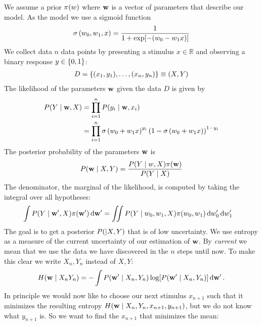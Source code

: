 
We assume a prior ${\pi(w)}$ where ${\bf w}$ is a vector of parameters that describe our model.
As the model we use a sigmoid function
\begin{align}
	{\sigma \left(w_0, w_1, x\right)} = \frac{1}{1 + \exp[-(w_0 - w_1 x)]}
\end{align}
We collect data $n$ data points by presenting a stimulus $x \in \mathbb{R}$ and observing a binary response $y \in \left\{ 0, 1 \right\}$:
\begin{align}
	 D = \left\{ (x_1, y_1), \dots, (x_n, y_n) \right\} \equiv (X, Y)
\end{align}
The likelihood of the parameters ${\bf w}$ given the data $D$ is given by
\begin{align}
	{P(Y \mid {\bf w}, X)}
	&= \prod_{i=1}^n {P(y_i \mid {\bf w}, x_i)} \\
	&= \prod_{i=1}^n {\sigma \left(w_0 + w_1 x\right)}^{y_i}
		\left( 1 - {\sigma \left(w_0 + w_1 x\right)} \right)^{1-y_i}
\end{align}
The posterior probability of the parameters ${\bf w}$ is
\begin{align}
	{P({\bf w} \mid X, Y)} = \frac{{P(Y \mid w, X)} {\pi({\bf w})}}{{P(Y \mid X)}}
\end{align}
The denominator, \ie the marginal of the likelihood, is computed by taking the integral over all hypotheses:
\begin{align}
	\int {P(Y \mid {\bf w}', X)} {\pi({\bf w}')} \,\mathrm{d} {\bf w}'
	&= \iint {P(Y \mid w_0, w_1, X)} {\pi(w_0, w_1)} \,\mathrm{d} w_0' \,\mathrm{d} w_1'
\end{align}
The goal is to get a posterior ${P({\bf \mid} X, Y)}$ that is of low uncertainty. We use entropy as a measure of the current uncertainty of our estimation of ${\bf w}$. By \emph{current} we mean that we use the data we have discovered in the $n$ steps until now. To make this clear we write $X_n, Y_n$ instead of $X, Y$:
\begin{align}
	H({\bf w} \mid X_n Y_n) = - \int {P({\bf w}' \mid X_n, Y_n)} \log[{P({\bf w}' \mid X_n, Y_n)}] \,\mathrm{d} {\bf w}' \,.
\end{align}
In principle we would now like to choose our next stimulus $x_{n+1}$ such that it minimizes the resulting entropy $H({\bf w} \mid X_n, Y_n, x_{n+1}, y_{n+1})$, but we do not know what $y_{n+1}$ is. So we want to find the $x_{n+1}$ that minimizes the mean:
